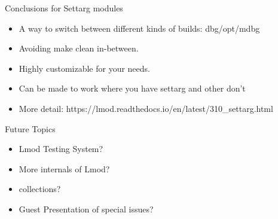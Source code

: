 \documentclass{beamer}
\begin{document}
\begin{frame}{Conclusions for Settarg modules}
  \begin{itemize}
    \item A way to switch between different kinds of builds: dbg/opt/mdbg
    \item Avoiding make clean in-between.
    \item Highly customizable for your needs.
    \item Can be made to work where you have settarg and other don't
    \item More detail: https://lmod.readthedocs.io/en/latest/310\_settarg.html
  \end{itemize}
\end{frame}

\begin{frame}{Future Topics}
  \begin{itemize}
    \item Lmod Testing System?
    \item More internals of Lmod?
    \item collections?
    \item Guest Presentation of special issues?
  \end{itemize}
\end{frame}
\end{document}

